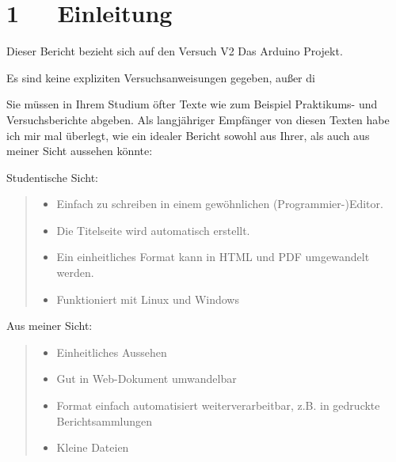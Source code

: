 \documentclass[a4paper,ngerman]{article}
\begin{document}
\newpage


\label{inhalt}
\renewcommand{\contentsname}{Inhalt}
\tableofcontents



\section{1~~~Einleitung%
  \label{einleitung}%
}

Dieser Bericht bezieht sich auf den Versuch V2 \textquotedbl{}Das Arduino Projekt\textquotedbl{}.

Es sind keine expliziten Versuchsanweisungen gegeben, außer di

Sie müssen in Ihrem Studium öfter Texte wie zum Beispiel Praktikums- und
Versuchsberichte abgeben. Als langjähriger \textquotedbl{}Empfänger\textquotedbl{} von diesen Texten
habe ich mir mal überlegt, wie ein \textquotedbl{}idealer\textquotedbl{} Bericht sowohl aus Ihrer, als
auch aus meiner Sicht aussehen könnte:

Studentische Sicht:
%
\begin{quote}
%
\begin{itemize}

\item Einfach zu schreiben in einem gewöhnlichen (Programmier-)Editor.

\item Die Titelseite wird automatisch erstellt.

\item Ein einheitliches Format kann in HTML und PDF umgewandelt werden.

\item Funktioniert mit Linux und Windows

\end{itemize}

\end{quote}

Aus meiner Sicht:
%
\begin{quote}
%
\begin{itemize}

\item Einheitliches Aussehen

\item Gut in Web-Dokument umwandelbar

\item Format einfach automatisiert weiterverarbeitbar, z.B. in gedruckte
Berichtsammlungen

\item Kleine Dateien

\end{itemize}

\end{quote}
\end{document}
